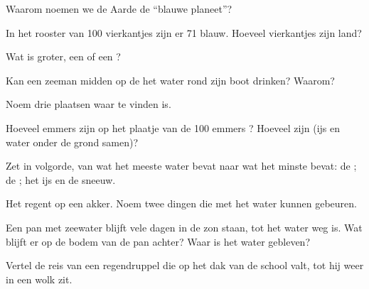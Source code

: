 \begin{exercise}[$\star$]\label{exo:g2:water-on-earth:2}
Waarom noemen we de Aarde de ``blauwe planeet''?
\end{exercise}

\begin{exercise}[$\star$]\label{exo:g2:water-on-earth:3}
In het rooster van 100 vierkantjes zijn er 71 blauw. Hoeveel vierkantjes
zijn land?
\end{exercise}

\begin{exercise}[$\star$]\label{exo:g2:water-on-earth:4}
Wat is groter, een  of een ?
\end{exercise}

\begin{exercise}[$\star$]\label{exo:g2:water-on-earth:5}
Kan een zeeman midden op de  het water rond zijn boot drinken?
Waarom?
\end{exercise}

\begin{exercise}[$\star$]\label{exo:g2:water-on-earth:6}
Noem drie plaatsen waar  te vinden is.
\end{exercise}

\begin{exercise}[$\star\star$]\label{exo:g2:water-on-earth:7}
Hoeveel emmers zijn op het plaatje van de 100 emmers ? Hoeveel
zijn  (ijs en water onder de grond samen)?
\end{exercise}

\begin{exercise}[$\star\star$]\label{exo:g2:water-on-earth:8}
Zet in volgorde, van wat het meeste water bevat naar wat het minste bevat:
de ; de ; het ijs en de sneeuw.
\end{exercise}

\begin{exercise}[$\star\star$]\label{exo:g2:water-on-earth:9}
Het regent op een akker. Noem twee dingen die met het water kunnen gebeuren.
\end{exercise}

\begin{exercise}[$\star\star$]\label{exo:g2:water-on-earth:10}
Een pan met zeewater blijft vele dagen in de zon staan, tot het water weg
is. Wat blijft er op de bodem van de pan achter? Waar is het water gebleven?
\end{exercise}

\begin{exercise}[$\star\star$]\label{exo:g2:water-on-earth:11}
Vertel de reis van een regendruppel die op het dak van de school valt, tot
hij weer in een wolk zit.
\end{exercise}
